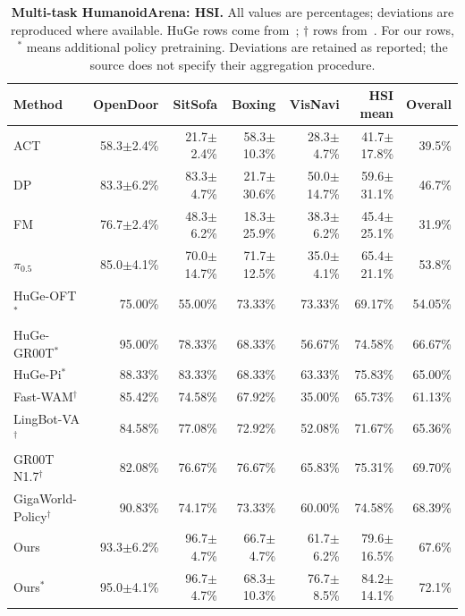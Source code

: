 \begin{table}[t]
\centering\small
\caption{\textbf{Multi-task HumanoidArena: HSI.} All values are percentages; deviations are reproduced where available. HuGe rows come from~\cite{liu2026huge}; $\dagger$ rows from~\cite{li2026languageforcing}. For our rows, $^{*}$ means additional policy pretraining. Deviations are retained as reported; the source does not specify their aggregation procedure.}
\label{tab:supp_multi_hsi}
\setlength{\tabcolsep}{4pt}
\begin{tabular}{lrrrrrr}\toprule
Method & OpenDoor & SitSofa & Boxing & VisNavi & HSI mean & Overall\\\midrule
ACT & 58.3$\pm$2.4\% & 21.7$\pm$2.4\% & 58.3$\pm$10.3\% & 28.3$\pm$4.7\% & 41.7$\pm$17.8\% & 39.5\%\\
DP & 83.3$\pm$6.2\% & 83.3$\pm$4.7\% & 21.7$\pm$30.6\% & 50.0$\pm$14.7\% & 59.6$\pm$31.1\% & 46.7\%\\
FM & 76.7$\pm$2.4\% & 48.3$\pm$6.2\% & 18.3$\pm$25.9\% & 38.3$\pm$6.2\% & 45.4$\pm$25.1\% & 31.9\%\\
$\pi_{0.5}$ & 85.0$\pm$4.1\% & 70.0$\pm$14.7\% & 71.7$\pm$12.5\% & 35.0$\pm$4.1\% & 65.4$\pm$21.1\% & 53.8\%\\
HuGe-OFT$^{*}$ & 75.00\% & 55.00\% & 73.33\% & 73.33\% & 69.17\% & 54.05\%\\
HuGe-GR00T$^{*}$ & 95.00\% & 78.33\% & 68.33\% & 56.67\% & 74.58\% & 66.67\%\\
HuGe-Pi$^{*}$ & 88.33\% & 83.33\% & 68.33\% & 63.33\% & 75.83\% & 65.00\%\\
Fast-WAM$^{\dagger}$ & 85.42\% & 74.58\% & 67.92\% & 35.00\% & 65.73\% & 61.13\%\\
LingBot-VA$^{\dagger}$ & 84.58\% & 77.08\% & 72.92\% & 52.08\% & 71.67\% & 65.36\%\\
GR00T N1.7$^{\dagger}$ & 82.08\% & 76.67\% & 76.67\% & 65.83\% & 75.31\% & 69.70\%\\
GigaWorld-Policy$^{\dagger}$ & 90.83\% & 74.17\% & 73.33\% & 60.00\% & 74.58\% & 68.39\%\\
Ours & 93.3$\pm$6.2\% & 96.7$\pm$4.7\% & 66.7$\pm$4.7\% & 61.7$\pm$6.2\% & 79.6$\pm$16.5\% & 67.6\%\\
Ours$^{*}$ & 95.0$\pm$4.1\% & 96.7$\pm$4.7\% & 68.3$\pm$10.3\% & 76.7$\pm$8.5\% & 84.2$\pm$14.1\% & 72.1\%\\
\bottomrule\end{tabular}\end{table}
